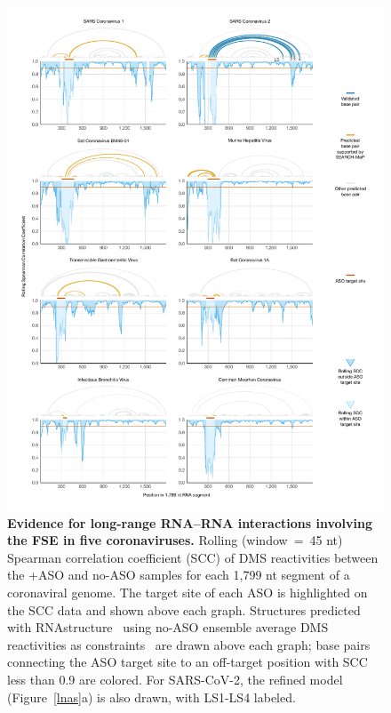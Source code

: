 \documentclass[main.tex]{subfiles}
\begin{document}
\begin{figure}[H]
	\includegraphics[width=\textwidth]{../MainFigures/covs/covs.pdf}
	\caption{\textbf{Evidence for long-range RNA--RNA interactions involving the FSE in five coronaviruses.} Rolling (window~=~45 nt) Spearman correlation coefficient (SCC) of DMS reactivities between the +ASO and no-ASO samples for each 1,799 nt segment of a coronaviral genome. The target site of each ASO is highlighted on the SCC data and shown above each graph. Structures predicted with RNAstructure~\cite{Mathews2004} using no-ASO ensemble average DMS reactivities as constraints~\cite{Cordero2012} are drawn above each graph; base pairs connecting the ASO target site to an off-target position with SCC less than 0.9 are colored. For SARS-CoV-2, the refined model (Figure~\ref{lnas}a) is also drawn, with LS1-LS4 labeled.}
	\label{covs}
\end{figure}
\end{document}
